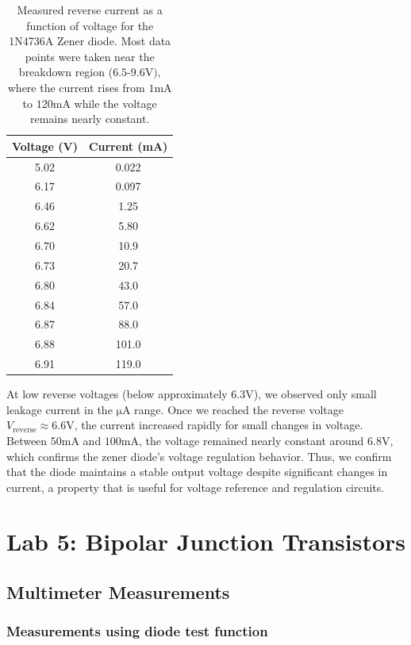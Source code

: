 \documentclass{article}
\begin{document}
\begin{table}[H]
\centering
    \begin{tabular}{|c|c|}
    \hline
    Voltage (V) & Current (mA) \\
    \hline
    5.02 & 0.022 \\
    6.17 & 0.097 \\
    6.46 & 1.25 \\
    6.62 & 5.80 \\
    6.70 & 10.9 \\
    6.73 & 20.7 \\
    6.80 & 43.0 \\
    6.84 & 57.0 \\
    6.87 & 88.0 \\
    6.88 & 101.0 \\
    6.91 & 119.0 \\
    \hline
    \end{tabular}
    \caption{Measured reverse current as a function of voltage for the 1N4736A Zener diode.
    Most data points were taken near the breakdown region ($6.5$-$9.6\si{\volt})$,
    where the current rises from $1\si{\milli\ampere}$ to $120\si{\milli\ampere}$
    while the voltage remains nearly constant.}
    \label{tab:zener_table}
\end{table}

\noindent At low reverse voltages (below approximately $6.3\si{\volt}$), we
observed only small leakage current in the $\si{\micro\ampere}$ range. Once we
reached the reverse voltage $V_\text{reverse}\approx6.6\si{\volt}$, the current
increased rapidly for small changes in voltage. Between $50\si{\milli\ampere}$
and $100\si{\milli\ampere}$, the voltage remained nearly constant around
$6.8\si{\volt}$, which confirms the zener diode's voltage regulation behavior. Thus,
we confirm that the diode maintains a stable output voltage despite significant changes
in current, a property that is useful for voltage reference and regulation circuits.



\section{Lab 5: Bipolar Junction Transistors}

\subsection{Multimeter Measurements}

\subsubsection{Measurements using diode test function}
\end{document}
